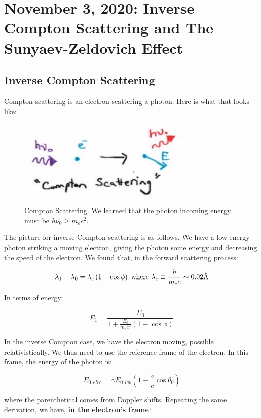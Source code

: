 \documentclass{article}
\newcommand{\angstrom}{\mbox{\normalfont\AA}}
\begin{document}
\section{November 3, 2020: Inverse Compton Scattering and The Sunyaev-Zeldovich Effect}

\subsection{Inverse Compton Scattering}

Compton scattering is an electron scattering a photon. Here is what that looks like: 

\begin{figure}
    \centering
    \includegraphics[width=0.75\textwidth]{Screen Shot 2020-11-01 at 4.20.53 PM.png}
    \caption{Compton Scattering. We learned that the photon incoming energy must be $h \nu_0 \geq m_e c^2$.}
    \label{fig:comptonsca}
\end{figure}

The picture for inverse Compton scattering is as follows. We have a low energy photon striking a moving electron, giving the photon some energy and decreasing the speed of the electron. We found that, in the forward scattering process:

$$
\lambda_1 - \lambda_0 = \lambda_c \left(1-\cos\phi\right) \text{ where } \lambda_c \equiv \frac{h}{m_e c} \sim 0.02 \angstrom
$$

In terms of energy:

$$
E_1 = \frac{E_0}{1 + \frac{E_0}{m_e c^2}\left(1 - \cos\phi\right)}
$$

In the inverse Compton case, we have the electron moving, possible relativistically. We thus need to use the reference frame of the electron. In this frame, the energy of the photon is:

$$
E_{0,elec} = \gamma E_{0,lab} \left(1-\frac{v}{c}\cos\theta_0\right)
$$

where the parenthetical comes from Doppler shifts. Repeating the same derivation, we have, \textbf{in the electron's frame}:
\end{document}
